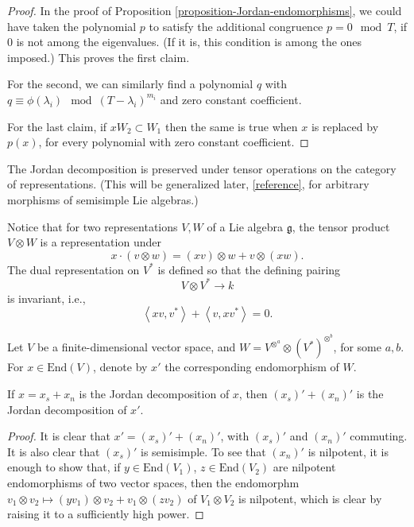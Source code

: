\begin{proof}
 In the proof of Proposition \ref{proposition-Jordan-endomorphisms}, we could have taken the polynomial $p$ to satisfy the additional congruence $p = 0 \mod T$, if $0$ is not among the eigenvalues. (If it is, this condition is among the ones imposed.) This proves the first claim.
 
 For the second, we can similarly find a polynomial $q$ with $q\equiv \phi(\lambda_i) \mod (T-\lambda_i)^{m_i}$ and zero constant coefficient. 
 
 For the last claim, if $xW_2\subset W_1$ then the same is true when $x$ is replaced by $p(x)$, for every polynomial with zero constant coefficient.
\end{proof}


The Jordan decomposition is preserved under tensor operations on the category of representations. (This will be generalized later, \ref{reference}, for arbitrary morphisms of semisimple Lie algebras.)

Notice that for two representations $V, W$ of a Lie algebra $\mathfrak g$, the tensor product $V\otimes W$ is a representation under 
$$ x \cdot (v\otimes w) = (xv)\otimes w + v\otimes (xw).$$
The dual representation on $V^*$ is defined so that the defining pairing
$$ V\otimes V^*\to k$$ 
is invariant, i.e., 
\begin{equation}
 \label{equation-dual-representation-Liealgebra}
\left< xv, v^*\right> + \left < v, xv^*\right> =0.
\end{equation}

\begin{lemma}
\label{lemma-Jordan-tensors}
Let $V$ be a finite-dimensional vector space, and $W = V^{\otimes^a}\otimes (V^*)^{\otimes^b}$, for some $a, b$. For $x\in \text{End}(V)$, denote by $x'$ the corresponding endomorphism of $W$.

If $x=x_s + x_n$ is the Jordan decomposition of $x$, then $(x_s)'+(x_n)'$ is the Jordan decomposition of $x'$. 
\end{lemma}


\begin{proof}
 It is clear that $x'=(x_s)'+(x_n)'$, with $(x_s)'$ and $(x_n)'$ commuting. It is also clear that $(x_s)'$ is semisimple. To see that $(x_n)'$ is nilpotent, it is enough to show that, if $y\in \text{End}(V_1)$, $z\in \text{End}(V_2)$ are nilpotent endomorphisms of two vector spaces, then the endomorphm $v_1\otimes v_2\mapsto (yv_1) \otimes v_2 + v_1 \otimes (zv_2)$ of $V_1\otimes V_2$ is nilpotent, which is clear by raising it to a sufficiently high power.
\end{proof}





